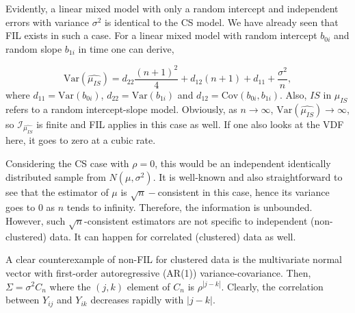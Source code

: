 \documentclass[11pt,a5paper,twoside]{book}
\begin{document}
Evidently, a linear mixed model with only a random intercept and independent errors with variance $\sigma^2$ is identical to the CS model. We have already seen that FIL exists in such a case. For a linear mixed model with random intercept $b_{0i}$ and random slope $b_{1i}$ in time one can derive,

$$\mathrm{Var}(\widehat{\mu_{IS}})= d_{22} \frac{(n+1)^2}{4} + d_{12} (n+1) + d_{11} + \frac{\sigma^2}{n},$$
where $d_{11}=\mathrm{Var}(b_{0i})$, $d_{22}=\mathrm{Var}(b_{1i})$ and $d_{12}=\mathrm{Cov}(b_{0i},b_{1i})$. Also, $IS$ in $\mu_{IS}$ refers to a random intercept-slope model. Obviously, as $n\rightarrow\infty$, $\mathrm{Var}(\widehat{\mu_{IS}}) \rightarrow \infty$, so $\mathcal{I}_{\widehat{\mu_{IS}}}$ is finite and FIL applies in this case as well. If one also looks at the VDF here, it goes to zero at a cubic rate.

Considering the CS case with $\rho=0$, this would be an independent identically distributed sample from $N(\mu,\sigma^2)$. It is well-known and also straightforward to see that the estimator of $\mu$ is $\sqrt{n}-$consistent in this case, hence its variance goes to $0$ as $n$ tends to infinity. Therefore, the information is unbounded. However, such $\sqrt{n}$-consistent estimators are not specific to independent (non-clustered) data. It can happen for correlated (clustered) data as well. 


A clear counterexample of non-FIL for clustered data is the multivariate normal vector with first-order autoregressive (AR(1)) variance-covariance. Then, $\Sigma=\sigma^2 C_n$ where the $(j,k)$ element of $C_n$ is $\rho^{|j-k|}$. Clearly, the correlation between $Y_{ij}$ and $Y_{ik}$ decreases rapidly with $|j-k|$. 
\end{document}
